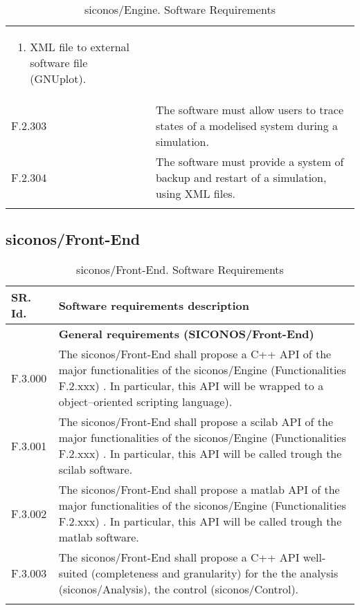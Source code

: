 \begin{longtable}{%
    |>{\columncolor[gray]{.8}}p{}%
    |>{\columncolor[gray]{.95}}p{}|}
\begin{enumerate}
                \item XML file to external software file (GNUplot).
                \end{enumerate}\\ 
  F.2.303  & The software must allow users to trace states of a modelised system during a simulation. \\
  F.2.304  & The software must provide a system of backup and restart of a simulation, using XML files. \\
  \caption{\ac{siconos}/Engine. Software Requirements}\\
\end{longtable}



\subsection{\ac{siconos}/Front-End}
\begin{longtable}{%
|>{\columncolor[gray]{.8}}p{}%
|>{\columncolor[gray]{.95}}p{}|}
\hline
\rowcolor[gray]{.8}   SR. Id. & Software requirements description \\
\hline 
   & \textbf{ General requirements (SICONOS/Front-End)}\\
   \hline
   F.3.000 & The \ac{siconos}/Front-End shall propose a C++  API  of the major functionalities of the \ac{siconos}/Engine (Functionalities F.2.xxx)  . In particular, this API will be wrapped to a object--oriented scripting language). \\
   F.3.001 & The \ac{siconos}/Front-End shall propose a \ac{scilab}  API  of the major functionalities of the \ac{siconos}/Engine (Functionalities F.2.xxx)  . In particular, this API will be  called trough the \ac{scilab} software. \\ 
   F.3.002 & The \ac{siconos}/Front-End shall propose a \ac{matlab}  API  of the major functionalities of the \ac{siconos}/Engine (Functionalities F.2.xxx)  . In particular, this API will be  called trough the \ac{matlab} software. \\
   F.3.003 & The \ac{siconos}/Front-End shall propose a C++  API well-suited (completeness and granularity) for the the analysis (\ac{siconos}/Analysis), the control (\ac{siconos}/Control).    \\
\hline
\caption{\ac{siconos}/Front-End. Software Requirements}\\
\end{longtable}

